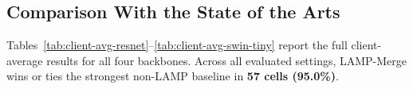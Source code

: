 \documentclass[letterpaper]{article} %
\begin{document}
\subsection{Comparison With the State of the Arts}


Tables~\ref{tab:client-avg-resnet}--\ref{tab:client-avg-swin-tiny} report the full client-average results for all four backbones. Across all evaluated settings, LAMP-Merge wins or ties the strongest non-LAMP baseline in \textbf{57 cells (95.0\%)}.

\setcounter{dbltopnumber}{4}
\setcounter{topnumber}{4}
\setcounter{totalnumber}{4}
\end{document}
